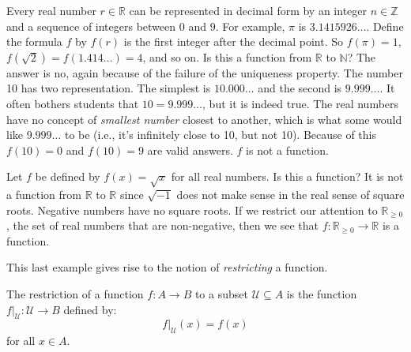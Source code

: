             \begin{example}
                Every real number $r\in\mathbb{R}$ can be represented in
                decimal form by an integer $n\in\mathbb{Z}$ and a sequence of
                integers between $0$ and $9$. For example, $\pi$ is
                $3.1415926\dots$. Define the formula $f$ by $f(r)$ is the first
                integer after the decimal point. So $f(\pi)=1$,
                $f(\sqrt{2})=f(1.414\dots)=4$, and so on. Is this a function
                from $\mathbb{R}$ to $\mathbb{N}$? The answer is no, again
                because of the failure of the uniqueness property. The number
                10 has two representation. The simplest is
                $10.000\dots$ and the second is $9.999\dots$. It often bothers
                students that $10=9.999\dots$, but it is indeed true. The
                real numbers have no concept of \textit{smallest number} closest
                to another, which is what some would like $9.999\dots$ to be
                (i.e., it's infinitely close to 10, but not 10). Because of this
                $f(10)=0$ and $f(10)=9$ are valid answers. $f$ is not a
                function.
            \end{example}
            \begin{example}
                Let $f$ be defined by $f(x)=\sqrt{x}$ for all real numbers.
                Is this a function? It is not a function from $\mathbb{R}$ to
                $\mathbb{R}$ since $\sqrt{-1}$ does not make sense in the
                real sense of square roots. Negative numbers have no square
                roots. If we restrict our attention to $\mathbb{R}_{\geq{0}}$,
                the set of real numbers that are non-negative, then we see
                that $f:\mathbb{R}_{\geq{0}}\rightarrow\mathbb{R}$ is a
                function.
            \end{example}
            This last example gives rise to the notion of \textit{restricting}
            a function.
            \begin{definition}
                The restriction of a function $f:A\rightarrow{B}$ to a
                subset $\mathcal{U}\subseteq{A}$ is the function
                $f|_{\mathcal{U}}:\mathcal{U}\rightarrow{B}$ defined by:
                \begin{equation}
                    f|_{\mathcal{U}}(x)=f(x)
                \end{equation}
                for all $x\in{A}$.
            \end{definition}
